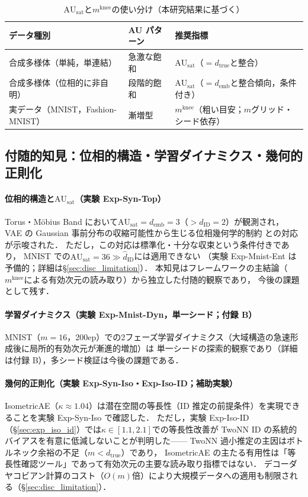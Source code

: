\documentclass[11pt,a4paper]{jsarticle}
\newcommand{\dID}{d_{\mathrm{ID}}}
\newcommand{\dtrue}{d_{\mathrm{true}}}
\newcommand{\kap}{\kappa}
\newcommand{\AUsat}{\mathrm{AU}_{\mathrm{sat}}}
\newcommand{\mknee}{m^{\mathrm{knee}}}
\newcommand{\demb}{d_{\mathrm{emb}}}
\begin{document}
\begin{table}[H]
\centering
\caption{$\AUsat$と$\mknee$の使い分け（本研究結果に基づく）}
\label{tab:au_comparison}
\small
\begin{tabular}{lll}
\toprule
データ種別 & AU パターン & 推奨指標 \\
\midrule
合成多様体（単純，単連結） & 急激な飽和 & $\AUsat$（$= \dtrue$と整合） \\
合成多様体（位相的に非自明） & 段階的飽和 & $\AUsat$（$= \demb$と整合傾向，条件付き） \\
実データ（MNIST，Fashion-MNIST） & 漸増型 & $\mknee$（粗い目安；$m$グリッド・シード依存） \\
\bottomrule
\end{tabular}
\end{table}

\subsection{付随的知見：位相的構造・学習ダイナミクス・幾何的正則化}\label{sec:disc_incidental}

\paragraph{位相的構造と$\AUsat$（実験 Exp-Syn-Top）}
Torus・Möbius Band において$\AUsat = \demb = 3$（$> \dID = 2$）が観測され，
VAE の Gaussian 事前分布の収縮可能性から生じる位相幾何学的制約
\cite{hatcher2002algebraic,guillemin1974differential}との対応が示唆された．
ただし，この対応は標準化・十分な収束という条件付きであり，
MNIST での$\AUsat = 36 \gg \hat{d}_\mathrm{ID}$には適用できない
（実験 Exp-Mnist-Ent は予備的；詳細は§\ref{sec:disc_limitation}）．
本知見はフレームワークの主結論（$\mknee$による有効次元の読み取り）から独立した付随的観察であり，
今後の課題として残す．

\paragraph{学習ダイナミクス（実験 Exp-Mnist-Dyn，単一シード；付録 B）}
MNIST（$m=16$，200ep）での2フェーズ学習ダイナミクス（大域構造の急速形成後に局所的有効次元が漸進的増加）は
単一シードの探索的観察であり（詳細は付録 B），多シード検証は今後の課題である．

\paragraph{幾何的正則化（実験 Exp-Syn-Iso・Exp-Iso-ID；補助実験）}
IsometricAE（$\kap \approx 1.04$）は潜在空間の等長性（ID 推定の前提条件）を実現できることを実験 Exp-Syn-Iso で確認した．
ただし，実験 Exp-Iso-ID（§\ref{sec:exp_iso_id}）では$\kap \in [1.1, 2.1]$での等長性改善が
TwoNN ID の系統的バイアスを有意に低減しないことが判明した——
TwoNN 過小推定の主因はボトルネック余裕の不足（$m < d_\mathrm{true}$）であり，
IsometricAE の主たる有用性は「等長性確認ツール」であって有効次元の主要な読み取り指標ではない．
デコーダヤコビアン計算のコスト（$O(m)$倍）により大規模データへの適用も制限される（§\ref{sec:disc_limitation}）．
\end{document}
